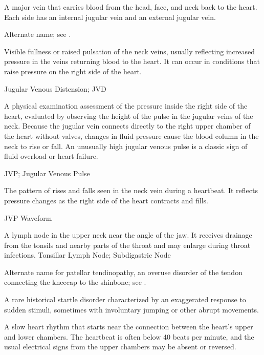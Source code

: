  A major vein that carries blood from the head, face, and neck back to the heart. Each side has an internal jugular vein and an external jugular vein.

 Alternate name; see .

 Visible fullness or raised pulsation of the neck veins, usually reflecting increased pressure in the veins returning blood to the heart. It can occur in conditions that raise pressure on the right side of the heart.

\synonyms
Jugular Venous Distension; JVD

 A physical examination assessment of the pressure inside the right side of the heart, evaluated by observing the height of the pulse in the jugular veins of the neck. Because the jugular vein connects directly to the right upper chamber of the heart without valves, changes in fluid pressure cause the blood column in the neck to rise or fall. An unusually high jugular venous pulse is a classic sign of fluid overload or heart failure.

\synonyms
JVP; Jugular Venous Pulse

 The pattern of rises and falls seen in the neck vein during a heartbeat. It reflects pressure changes as the right side of the heart contracts and fills.

\synonyms
JVP Waveform

 A lymph node in the upper neck near the angle of the jaw. It receives drainage from the tonsils and nearby parts of the throat and may enlarge during throat infections.
\synonyms
Tonsillar Lymph Node; Subdigastric Node

 Alternate name for patellar tendinopathy, an overuse disorder of the tendon connecting the kneecap to the shinbone; see .

 A rare historical startle disorder characterized by an exaggerated response to sudden stimuli, sometimes with involuntary jumping or other abrupt movements.

 A slow heart rhythm that starts near the connection between the heart's upper and lower chambers. The heartbeat is often below 40 beats per minute, and the usual electrical signs from the upper chambers may be absent or reversed.

